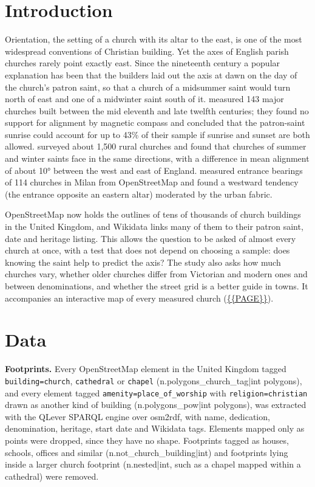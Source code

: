 \documentclass[11pt,a4paper]{article}
\begin{document}
\section{Introduction}
Orientation, the setting of a church with its altar to the east, is one of the most widespread conventions of Christian building. Yet the axes of English parish churches rarely point exactly east. Since the nineteenth century a popular explanation has been that the builders laid out the axis at dawn on the day of the church's patron saint, so that a church of a midsummer saint would turn north of east and one of a midwinter saint south of it. \citet{alicunich} measured 143 major churches built between the mid eleventh and late twelfth centuries; they found no support for alignment by magnetic compass and concluded that the patron-saint sunrise could account for up to 43\% of their sample if sunrise and sunset are both allowed. \citet{hinton} surveyed about 1,500 rural churches and found that churches of summer and winter saints face in the same directions, with a difference in mean alignment of about 10° between the west and east of England. \citet{furuhashi} measured entrance bearings of 114 churches in Milan from OpenStreetMap and found a westward tendency (the entrance opposite an eastern altar) moderated by the urban fabric.

OpenStreetMap now holds the outlines of tens of thousands of church buildings in the United Kingdom, and Wikidata links many of them to their patron saint, date and heritage listing. This allows the question to be asked of almost every church at once, with a test that does not depend on choosing a sample: does knowing the saint help to predict the axis? The study also asks how much churches vary, whether older churches differ from Victorian and modern ones and between denominations, and whether the street grid is a better guide in towns. It accompanies an interactive map of every measured church (\url{{{PAGE}}}).

\section{Data}
\textbf{Footprints.} Every OpenStreetMap \citep{osm} element in the United Kingdom tagged \texttt{building=church}, \texttt{cathedral} or \texttt{chapel} ({{n.polygons_church_tag|int}} polygons), and every element tagged \texttt{amenity=place\_of\_worship} with \texttt{religion=christian} drawn as another kind of building ({{n.polygons_pow|int}} polygons), was extracted with the QLever SPARQL engine \citep{qlever} over osm2rdf, with name, dedication, denomination, heritage, start date and Wikidata tags. Elements mapped only as points were dropped, since they have no shape. Footprints tagged as houses, schools, offices and similar ({{n.not_church_building|int}}) and footprints lying inside a larger church footprint ({{n.nested|int}}, such as a chapel mapped within a cathedral) were removed.
\end{document}
